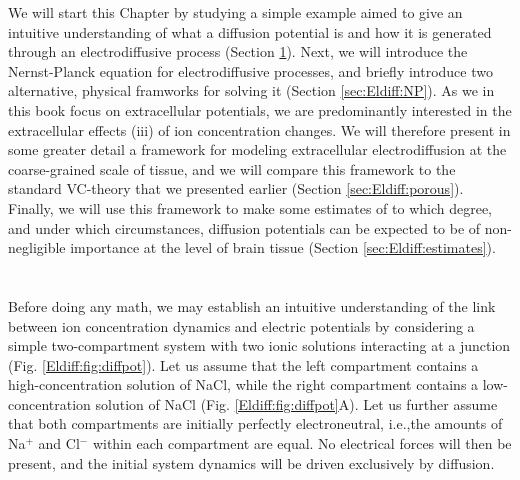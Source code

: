 We will start this Chapter by studying a simple example aimed to give an intuitive understanding of what a diffusion potential is and how it is generated through an electrodiffusive process (Section \ref{sec:Eldiff:LJpot}). 
Next, we will introduce the Nernst-Planck equation for electrodiffusive processes, and briefly introduce two alternative, physical framworks for solving it (Section \ref{sec:Eldiff:NP}). As we in this book focus on extracellular potentials, we are predominantly interested in the extracellular effects (iii) of ion concentration changes. We  will therefore present in some greater detail a framework for modeling extracellular electrodiffusion at the coarse-grained scale of tissue, and we will compare this framework to the standard VC-theory that we presented earlier (Section \ref{sec:Eldiff:porous}). Finally, we will use this framework to make some estimates of to which degree, and under which circumstances, diffusion potentials can be expected to be of non-negligible importance at the level of brain tissue (Section \ref{sec:Eldiff:estimates}).


\section{}
\label{sec:Eldiff:LJpot}
Before doing any math, we may establish an intuitive understanding of the link between ion concentration dynamics and electric potentials by considering a simple two-compartment system with two ionic solutions interacting at a junction  (Fig. \ref{Eldiff:fig:diffpot}). Let us assume that the left compartment contains a high-concentration solution of NaCl, while the right compartment contains a low-concentration solution of NaCl (Fig. \ref{Eldiff:fig:diffpot}A). Let us further assume that both compartments are initially perfectly electroneutral, i.e.,the amounts of Na$^+$ and Cl$^-$ within each compartment are equal. No  electrical forces will then be present, and the initial system dynamics will be driven exclusively by diffusion. 


